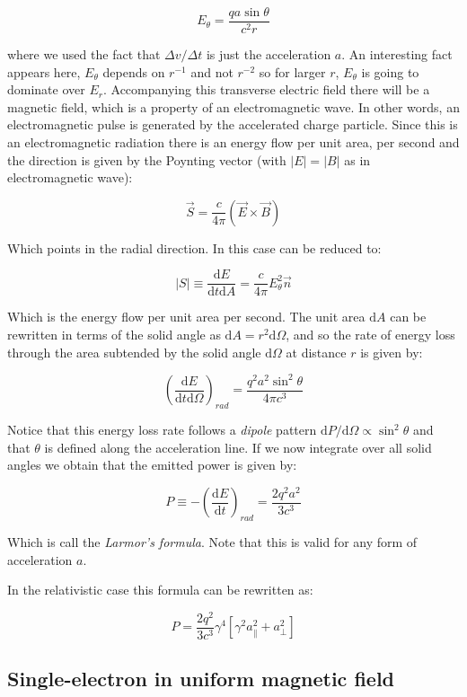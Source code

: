 \documentclass[
  letterpaper,
  DIV=11,
  numbers=noendperiod]{scrreprt}
\begin{document}
\[E_\theta = \frac{q a \sin\theta}{c^2 r}\]

where we used the fact that \(\Delta v/\Delta t\) is just the
acceleration \(a\). An interesting fact appears here, \(E_\theta\)
depends on \(r^{-1}\) and not \(r^{-2}\) so for larger \(r\),
\(E_\theta\) is going to dominate over \(E_r\). Accompanying this
transverse electric field there will be a magnetic field, which is a
property of an electromagnetic wave. In other words, an electromagnetic
pulse is generated by the accelerated charge particle. Since this is an
electromagnetic radiation there is an energy flow per unit area, per
second and the direction is given by the Poynting vector (with
\(|E|=|B|\) as in electromagnetic wave):

\[\vec{S}  = \frac{c}{4\pi}(\vec{E}\times\vec{B})\]

Which points in the radial direction. In this case can be reduced to:

\[|S| \equiv \frac{ \mathrm{d}E}{\mathrm{d}t \mathrm{d}A} = \frac{c}{4\pi} E^2_\theta \vec{n}\]

Which is the energy flow per unit area per second. The unit area
\(\mathrm{d}A\) can be rewritten in terms of the solid angle as
\(\mathrm{d} A= r^2\mathrm{d}\Omega\), and so the rate of energy loss
through the area subtended by the solid angle \(\mathrm{d} \Omega\) at
distance \(r\) is given by:

\[\left(\frac{\mathrm{d}E}{\mathrm{d}t \mathrm{d} \Omega}\right)_{rad}  = \frac{q^2a^2 \sin^2 \theta}{4\pi c^3}\]

Notice that this energy loss rate follows a \emph{dipole} pattern
\(\mathrm{d}P/\mathrm{d}\Omega \propto \sin^2 \theta\) and that
\(\theta\) is defined along the acceleration line. If we now integrate
over all solid angles we obtain that the emitted power is given by:

\[P \equiv -\left(\frac{\mathrm{d}E}{\mathrm{d}t}\right)_{rad} = \frac{2q^2 a^2 }{3c^3}\]

Which is call the \emph{Larmor's formula}. Note that this is valid for
any form of acceleration \(a\).

In the relativistic case this formula can be rewritten as:

\[P  = \frac{2q^2}{3c^3} \gamma^4 [ \gamma^2 a_{\parallel}^2 + a^2_{\perp}] \]

\subsection{Single-electron in uniform magnetic
field}\label{single-electron-in-uniform-magnetic-field}
\end{document}
